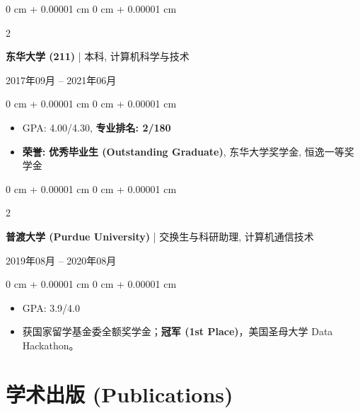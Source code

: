\documentclass[10pt, letterpaper]{article}
\newenvironment{highlights}{
    \begin{itemize}[
        topsep=0.05 cm,
        parsep=0.05 cm,
        partopsep=0pt,
        itemsep=0pt,
        leftmargin=0.4 cm + 10pt
    ]
}{
    \end{itemize}
} %
\newenvironment{onecolentry}{
    \begin{adjustwidth}{
        0 cm + 0.00001 cm
    }{
        0 cm + 0.00001 cm
    }
}{
    \end{adjustwidth}
} %
\newenvironment{twocolentry}[2][]{
    \onecolentry
    \def\secondColumn{#2}
    \setcolumnwidth{\fill, 4.5 cm}
    \begin{paracol}{2}
}{
    \switchcolumn \raggedleft \secondColumn
    \end{paracol}
    \endonecolentry
} %
\begin{document}
        \vspace{0.2 cm}
        
        \begin{twocolentry}{
            2017年09月 – 2021年06月
        }
            \textbf{东华大学 (211)} | 本科, 计算机科学与技术
        \end{twocolentry}
        \vspace{0.10 cm}
        \begin{onecolentry}
            \begin{highlights}
                \item GPA: 4.00/4.30, \textbf{专业排名: 2/180}
                \item \textbf{荣誉:} \textbf{优秀毕业生 (Outstanding Graduate)}, 东华大学奖学金, 恒逸一等奖学金
            \end{highlights}
        \end{onecolentry}
        
        \vspace{0.2 cm}

        \begin{twocolentry}{
            2019年08月 – 2020年08月
        }
            \textbf{普渡大学 (Purdue University)} | 交换生与科研助理, 计算机通信技术
        \end{twocolentry}
        \vspace{0.10 cm}
        \begin{onecolentry}
            \begin{highlights}
                \item GPA: 3.9/4.0
                \item 获国家留学基金委全额奖学金；\textbf{冠军 (1st Place)}，美国圣母大学 Data Hackathon。
            \end{highlights}
        \end{onecolentry}
        
    \section{学术出版 (Publications)}
\end{document}
